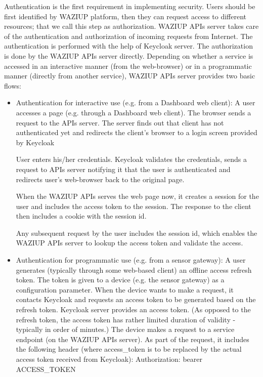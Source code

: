 Authentication is the first requirement in implementing security. Users should be first identified by WAZIUP platform, then they can request access to different resources; that we call this step as authorization. WAZIUP APIs server takes care of the authentication and authorization of incoming requests from Internet. The authentication is performed with the help of Keycloak server. The authorization is done by the WAZIUP APIs server directly.
Depending on whether a service is accessed in an interactive manner (from the web-browser) or in a programmatic manner (directly from another service), WAZIUP APIs server provides two basic flows:
\begin{itemize}
\item Authentication for interactive use (e.g. from a Dashboard web client):
A user accesses a page (e.g. through a Dashboard web client). The browser sends a request to the APIs server. The server finds out that client has not authenticated yet and redirects the client’s browser to a login screen provided by Keycloak

User enters his/her credentials.
Keycloak validates the credentials, sends a request to APIs server notifying it that the user is authenticated and redirects user’s web-browser back to the original page.

When the WAZIUP APIs serves the web page now, it creates a session for the user and includes the access token to the session. The response to the client then includes a cookie with the session id.

Any subsequent request by the user includes the session id, which enables the WAZIUP APIs server to lookup the access token and validate the access.

\item Authentication for programmatic use (e.g. from a sensor gateway):
A user generates (typically through some web-based client) an offline access refresh token. The token is given to a device (e.g. the sensor gateway) as a configuration parameter.
When the device wants to make a request, it contacts Keycloak and requests an access token to be generated based on the refresh token.
Keycloak server provides an access token. (As opposed to the refresh token, the access token has rather limited duration of validity - typically in order of minutes.)
The device makes a request to a service endpoint (on the WAZIUP APIs server). As part of the request, it includes the following header (where access\_token is to be replaced by the actual access token received from Keycloak):
Authorization: bearer ACCESS\_TOKEN
\end{itemize}

